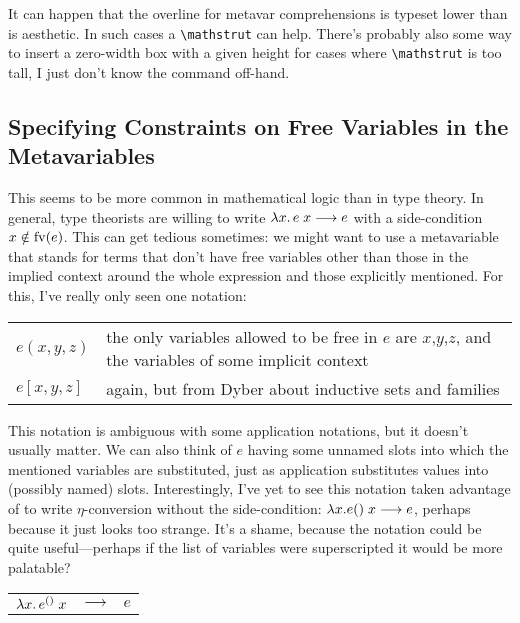 \documentclass[11pt]{article} %
\theoremstyle{definition}
\theoremstyle{remark}
\begin{document}
It can happen that the overline for metavar comprehensions is typeset lower than is aesthetic.
In such cases a \verb!\mathstrut! can help.
There's probably also some way to insert a zero-width box with a given height for cases where \verb!\mathstrut! is too tall, I just don't know the command off-hand.

\subsection{Specifying Constraints on Free Variables in the Metavariables}

This seems to be more common in mathematical logic than in type theory.
In general, type theorists are willing to write ${\lambda}{x}.\,e\;x \longrightarrow e$ with a side-condition $x \notin \mathrm{fv}(e)$.
This can get tedious sometimes: we might want to use a metavariable that stands for terms that don't have free variables other than those in the implied context around the whole expression and those explicitly mentioned.
For this, I've really only seen one notation:
\begin{center}
\renewcommand{\arraystretch}{1.2}
\begin{tabular}{lp{10cm}}
$e(x, y, z)$ & the only variables allowed to be free in $e$ are $x$,$y$,$z$, and the variables of some implicit context \\
$e[x, y, z]$ & again, but from Dyber about inductive sets and families \\
\end{tabular}
\end{center}

This notation is ambiguous with some application notations, but it doesn't usually matter.
We can also think of $e$ having some unnamed slots into which the mentioned variables are substituted, just as application substitutes values into (possibly named) slots.
Interestingly, I've yet to see this notation taken advantage of to write $\eta$-conversion without the side-condition: $\lambda x.e()\;x \longrightarrow e$, perhaps because it just looks too strange.
It's a shame, because the notation could be quite useful---perhaps if the list of variables were superscripted it would be more palatable?
\begin{center}
\renewcommand{\arraystretch}{1.2}
\begin{tabular}{rcl}
${\lambda}{x}.\,e^{()}\;x$ & $\longrightarrow$ & $e$ \\
\end{tabular}
\end{center}
\end{document}
